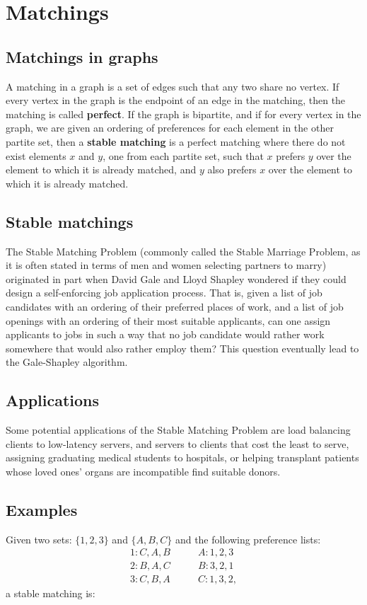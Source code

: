 \documentclass[11pt]{article}
\begin{document}
\section{Matchings}
\subsection{Matchings in graphs}
A matching in a graph is a set of edges such that any two share no vertex. If
every vertex in the graph is the endpoint of an edge in the matching, then the
matching is called \textbf{perfect}. If the graph is bipartite, and if for
every vertex in the graph, we are given an ordering of preferences for each
element in the other partite set, then a \textbf{stable matching} is a perfect
matching where there do not exist elements $x$ and $y$, one from each partite
set, such that $x$ prefers $y$ over the element to which it is already matched,
and $y$ also prefers $x$ over the element to which it is already matched.



\subsection{Stable matchings}
The Stable Matching Problem (commonly called the Stable Marriage Problem, as
it is often stated in terms of men and women selecting partners to marry)
originated in part when David Gale and Lloyd Shapley wondered if they could
design a self-enforcing job application process\cite{Kleinberg}. That is,
given a list of job candidates with an ordering of their preferred places of
work, and a list of job openings with an ordering of their most suitable
applicants, can one assign applicants to jobs in such a way that no job
candidate would rather work somewhere that would also rather employ them? This
question eventually lead to the Gale-Shapley algorithm.


\subsection{Applications}
Some potential applications of the Stable Matching Problem are load balancing
clients to low-latency servers, and servers to clients that cost the least to
serve\cite{LoadBalance}, assigning graduating medical students to hospitals, or
helping transplant patients whose loved ones' organs are incompatible find
suitable donors\cite{Kidney}.


\subsection{Examples}
Given two sets: $\{1,2,3\}$ and $\{A,B,C\}$ and the following preference lists:
\begin{align*}
	1: C,A,B&\qquad A: 1,2,3\\
	2: B,A,C&\qquad B: 3,2,1\\
	3: C,B,A&\qquad C: 1,3,2,
\end{align*}
a stable matching is:
\begin{figure}[H]
\centering

\end{figure}
\end{document}
